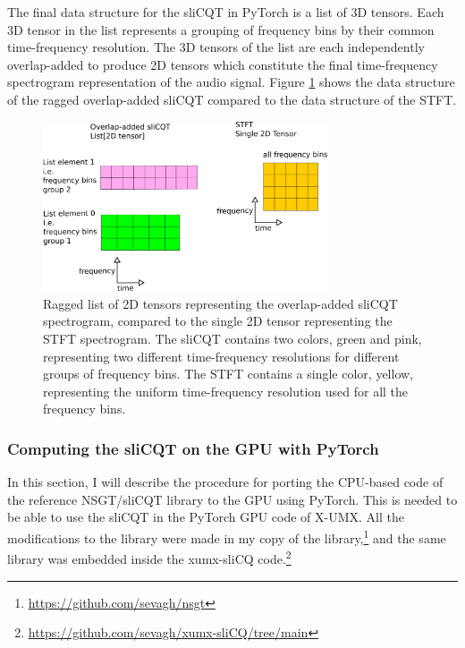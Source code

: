 \documentclass[report.tex]{subfiles}
\begin{document}
The final data structure for the sliCQT in PyTorch is a list of 3D tensors. Each 3D tensor in the list represents a grouping of frequency bins by their common time-frequency resolution. The 3D tensors of the list are each independently overlap-added to produce 2D tensors which constitute the final time-frequency spectrogram representation of the audio signal. Figure \ref{fig:2dslicqolastft} shows the data structure of the ragged overlap-added sliCQT compared to the data structure of the STFT.

\begin{figure}[ht]
	\centering
	\includegraphics[width=0.75\textwidth]{./images-blockdiagrams/2dslicqolastft.png}
	\caption{Ragged list of 2D tensors representing the overlap-added sliCQT spectrogram, compared to the single 2D tensor representing the STFT spectrogram. The sliCQT contains two colors, green and pink, representing two different time-frequency resolutions for different groups of frequency bins. The STFT contains a single color, yellow, representing the uniform time-frequency resolution used for all the frequency bins.}
	\label{fig:2dslicqolastft}
\end{figure}

\subsubsection{Computing the sliCQT on the GPU with PyTorch}
\label{sec:torchslicq}

In this section, I will describe the procedure for porting the CPU-based code of the reference NSGT/sliCQT library to the GPU using PyTorch. This is needed to be able to use the sliCQT in the PyTorch GPU code of X-UMX. All the modifications to the library were made in my copy of the library,\footnote{\url{https://github.com/sevagh/nsgt}} and the same library was embedded inside the xumx-sliCQ code.\footnote{\url{https://github.com/sevagh/xumx-sliCQ/tree/main}}
\end{document}
